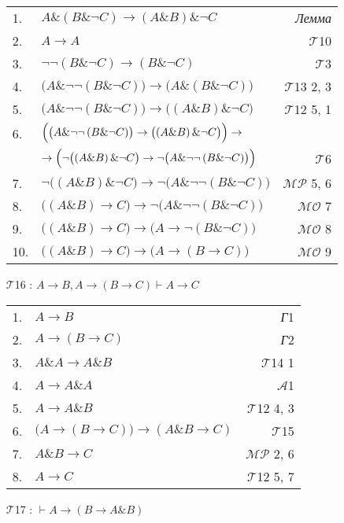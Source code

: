 \documentclass{article}
\begin{document}
\begin{itemize}
\begin{tabular}{llr}
1. & $A\&\left(B\&\neg C\right)\rightarrow\left(A\&B\right)\&\neg C$ & \textit{Лемма}\\
2. & $A\rightarrow A$ & $\mathcal{T}$10\\
3. & $\neg\neg\left(B\&\neg C\right)\rightarrow\left(B\&\neg C\right)$ & $\mathcal{T}$3\\
4. & $\bigl(A\&\neg\neg\left(B\&\neg C\right)\bigr)\rightarrow\bigl(A\&\left(B\&\neg C\right)\bigr)$ & $\mathcal{T}$13 2, 3\\
5. & $\bigl(A\&\neg\neg\left(B\&\neg C\right)\bigr)\rightarrow\bigl(\left(A\&B\right)\&\neg C\bigr)$ & $\mathcal{T}$12 5, 1\\
6. & $\Bigl(\bigl(A\&\neg\neg\left(B\&\neg C\right)\bigr)\rightarrow\bigl(\left(A\&B\right)\&\neg C\bigr)\Bigr)\rightarrow$ & \\
 & \hfill$\rightarrow\Bigl(\neg\bigl(\left(A\&B\right)\&\neg C\bigr)\rightarrow\neg\bigl(A\&\neg\neg\left(B\&\neg C\right)\bigr)\Bigr)$ & $\mathcal{T}$6\\
7. & $\neg\bigl(\left(A\&B\right)\&\neg C\bigr)\rightarrow\neg\bigl(A\&\neg\neg\left(B\&\neg C\right)\bigr)$ & $\mathcal{MP}$ 5, 6\\
8. & $\bigl(\left(A\& B\right)\rightarrow C\bigr)\rightarrow\neg\bigl(A\&\neg\neg\left(B\&\neg C\right)\bigr)$ & $\mathcal{MO}$ 7\\
9. & $\bigl(\left(A\& B\right)\rightarrow C\bigr)\rightarrow\bigl(A\rightarrow\neg\left(B\&\neg C\right)\bigr)$ & $\mathcal{MO}$ 8\\
10. & $\bigl(\left(A\& B\right)\rightarrow C\bigr)\rightarrow\bigl(A\rightarrow\left(B\rightarrow C\right)\bigr)$ & $\mathcal{MO}$ 9\\
\end{tabular}

\item[$\mathcal{T}$16]: $A\rightarrow B,A\rightarrow\left(B\rightarrow C\right)\vdash A\rightarrow C$

\begin{tabular}{llr}
1. & $A\rightarrow B$ & \textit{Г}1\\
2. & $A\rightarrow\left(B\rightarrow C\right)$ & \textit{Г}2\\
3. & $A\& A\rightarrow A\& B$ & $\mathcal{T}$14 1\\
4. & $A\rightarrow A\& A$ & $\mathcal{A}$1\\
5. & $A\rightarrow A\& B$ & $\mathcal{T}$12 4, 3\\
6. & $\bigl(A\rightarrow\left(B\rightarrow C\right)\bigr)\rightarrow\left(A\& B\rightarrow C\right)$ & $\mathcal{T}$15\\
7. & $A\& B\rightarrow C$ & $\mathcal{MP}$ 2, 6\\
8. & $A\rightarrow C$ & $\mathcal{T}$12 5, 7
\end{tabular}
\item[$\mathcal{T}$17]: $\vdash A\rightarrow\left(B\rightarrow A\&B\right)$


\end{itemize}
\end{document}
